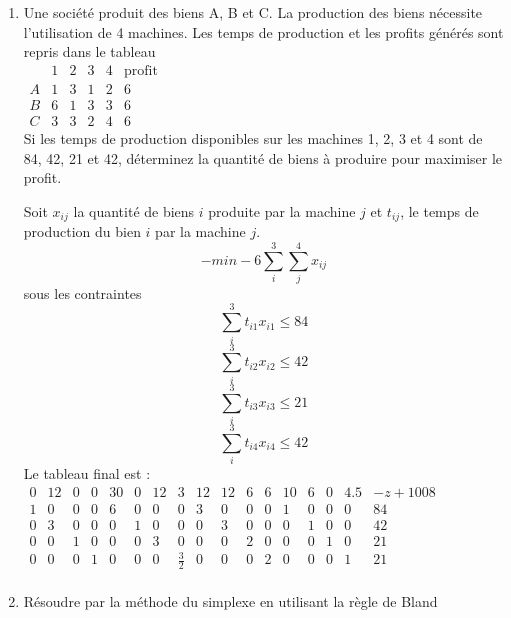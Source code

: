 \begin{enumerate}
  \item Une société produit des biens A, B et C. La production des biens nécessite l'utilisation de 4 machines. Les temps de
    production et les profits générés sont repris dans le tableau\\

    $
    \begin{array}{l|llll|l}
      & 1 & 2 & 3 & 4 & \mbox{profit}\\
      \hline
      A & 1 & 3 & 1 & 2 & 6\\
      B & 6 & 1 & 3 & 3 & 6\\
      C & 3 & 3 & 2 & 4 & 6
    \end{array}
    $
    \\

    Si les temps de production disponibles sur les machines 1, 2, 3 et 4  sont de 84, 42, 21 et 42,
    déterminez la quantité de biens à produire pour maximiser le profit.






    \begin{solution}
      Soit $x_{ij}$ la quantité de biens $i$ produite par la machine $j$ et $t_{ij}$, le temps de production du bien $i$ par la machine $j$.
      \newline
      $$ -min -6\sum_{i}^{3} \sum_{j}^{4}x_{ij}$$
      sous les contraintes \\
      $$ \sum_{i}^{3} t_{i1}x_{i1} \le 84$$
      $$ \sum_{i}^{3} t_{i2}x_{i2} \le 42$$
      $$ \sum_{i}^{3} t_{i3}x_{i3} \le 21$$
      $$ \sum_{i}^{3} t_{i4}x_{i4} \le 42$$
      Le tableau final est :\\
      \newline
      $\begin{array}
      {cccccccccccccccc|l}
      0&12&0&0&30&0&12&3&12&12&6&6&10&6&0&4.5&-z+1008 \\ \hline
      1&0&0&0&6&0&0&0&3&0&0&0&1&0&0&0&84\\
      0&3&0&0&0&1&0&0&0&3&0&0&0&1&0&0&42\\
      0&0&1&0&0&0&3&0&0&0&2&0&0&0&1&0&21\\
      0&0&0&1&0&0&0&\frac{3}{2}&0&0&0&2&0&0&0&1&21
      \\\end{array}$\\
    \end{solution}

  \item Résoudre par la méthode du simplexe en utilisant la règle de Bland




\end{enumerate}
